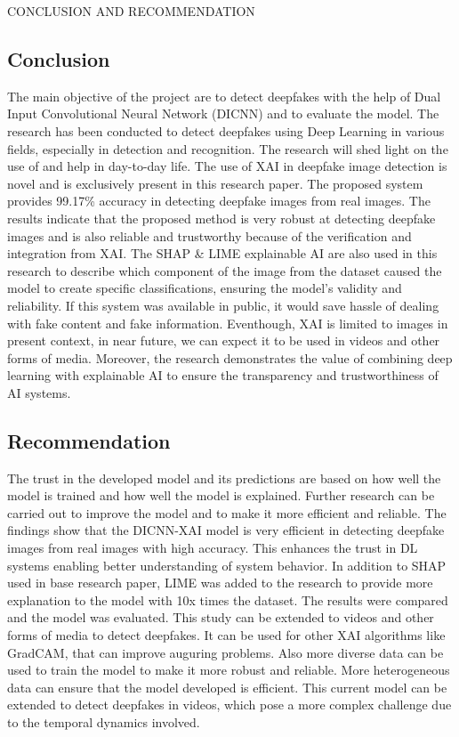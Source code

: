 \begin{section}[]{\uppercase{Conclusion and Recommendation}}

 \subsection{Conclusion}
The main objective of the project are to detect deepfakes with the help of Dual Input Convolutional Neural Network (DICNN) and to evaluate the model. The research has been conducted to detect deepfakes using Deep Learning in various fields, especially in detection and recognition. 
The research will shed light on the use of and help in day-to-day life. 
The use of XAI in deepfake image detection is novel and is exclusively present in this research paper. The proposed system provides 99.17\% accuracy in detecting
deepfake images from real images. The results indicate that the proposed method is very robust at
detecting deepfake images and is also reliable and trustworthy because of the verification and integration
from XAI.
The SHAP \& LIME explainable AI are also used in this
research to describe which component of the image from the dataset caused the model to create specific
classifications, ensuring the model’s validity and reliability.
If this system was available in public, it would save hassle of dealing with fake content and fake information.
Eventhough, XAI is limited to images in present context, in near future, we can expect it to be used in videos and other forms of media.
Moreover, the research demonstrates the value of combining deep learning with explainable AI to ensure the transparency and trustworthiness of AI systems.



\subsection{Recommendation}
The trust in the developed model and its predictions are based on how well the model is trained and how well the model is explained. 
Further research can be carried out to improve the model and to make it more efficient and reliable. The findings show that the DICNN-XAI model is very efficient in detecting deepfake images from real images with high accuracy. This enhances the trust in DL systems enabling better understanding of system behavior.
In addition to SHAP used in base research paper, LIME was added to the research to provide more explanation to the model with 10x times the dataset. The results were compared and the model was evaluated. This study can be extended to videos and other forms of media to detect deepfakes. It can be used for other XAI algorithms like GradCAM, that can improve auguring problems.
Also more diverse data can be used to train the model to make it more robust and reliable. More heterogeneous data can ensure that the model developed is efficient. This current model can be extended to detect deepfakes in videos, which pose a more complex challenge due to the temporal dynamics involved.
 
\end{section}

\pagebreak

